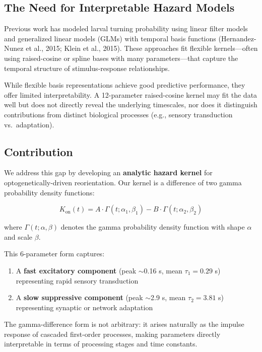 \documentclass[
  11pt,
  letterpaper,
]{article}
\begin{document}
\subsection{The Need for Interpretable Hazard Models}

Previous work has modeled larval turning probability using linear filter
models and generalized linear models (GLMs) with temporal basis
functions (Hernandez-Nunez et al., 2015; Klein et al., 2015). These
approaches fit flexible kernels---often using raised-cosine or spline
bases with many parameters---that capture the temporal structure of
stimulus-response relationships.

While flexible basis representations achieve good predictive
performance, they offer limited interpretability. A 12-parameter
raised-cosine kernel may fit the data well but does not directly reveal
the underlying timescales, nor does it distinguish contributions from
distinct biological processes (e.g., sensory transduction
vs.~adaptation).

\subsection{Contribution}

We address this gap by developing an \textbf{analytic hazard kernel} for
optogenetically-driven reorientation. Our kernel is a difference of two
gamma probability density functions:

\begin{equation}
K_{\text{on}}(t) = A \cdot \Gamma(t; \alpha_1, \beta_1) - B \cdot \Gamma(t; \alpha_2, \beta_2)
\label{eq:kernel}
\end{equation}

\noindent where \(\Gamma(t; \alpha, \beta)\) denotes the gamma
probability density function with shape \(\alpha\) and scale \(\beta\).

This 6-parameter form captures:

\begin{enumerate}
    \item A \textbf{fast excitatory component} (peak $\sim$0.16 s, mean $\tau_1 = 0.29$ s) representing rapid sensory transduction
    \item A \textbf{slow suppressive component} (peak $\sim$2.9 s, mean $\tau_2 = 3.81$ s) representing synaptic or network adaptation
\end{enumerate}

The gamma-difference form is not arbitrary: it arises naturally as the
impulse response of cascaded first-order processes, making parameters
directly interpretable in terms of processing stages and time constants.
\end{document}
